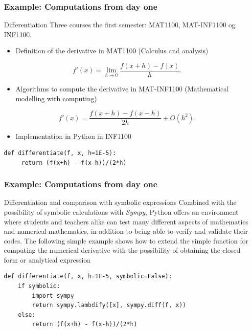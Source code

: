 \documentclass{beamer}
\begin{document}
\begin{frame}
\frametitle{Example: Computations from day one}

\begin{block}{Differentiation }
Three courses the first semester:  MAT1100, MAT-INF1100 og INF1100.
\begin{itemize}
\item Definition  of the derivative in  MAT1100 (Calculus and analysis) 
\end{itemize}

\noindent
\[
 f'(x)=\lim_{h \rightarrow 0}\frac{f(x+h)-f(x)}{h}.
\]
\begin{itemize}
\item Algorithms to compute the derivative in MAT-INF1100  (Mathematical modelling with computing)
\end{itemize}

\noindent
\[
 f'(x)= \frac{f(x+h)-f(x-h)}{2h}+O(h^2).
\]
\begin{itemize}
\item Implementation in Python in INF1100
\end{itemize}

\noindent
\begin{verbatim}
def differentiate(f, x, h=1E-5):
     return (f(x+h) - f(x-h))/(2*h)
\end{verbatim}

\end{block}
\end{frame}

\begin{frame}
\frametitle{Example: Computations from day one}

\begin{block}{Differentiation and comparison with symbolic expressions }
Combined with the possibility of symbolic calculations with \emph{Sympy}, Python offers an environment where students and teachers alike can test many different aspects of mathematics and numerical mathematics, in addition to being able to verify and validate their codes. The following simple example shows how to extend the simple function for computing the numerical derivative with the possibility of obtaining the closed form or analytical expression
\begin{verbatim}
def differentiate(f, x, h=1E-5, symbolic=False):
    if symbolic:
        import sympy
        return sympy.lambdify([x], sympy.diff(f, x))
    else:
        return (f(x+h) - f(x-h))/(2*h)
\end{verbatim}

\end{block}
\end{frame}
\end{document}
